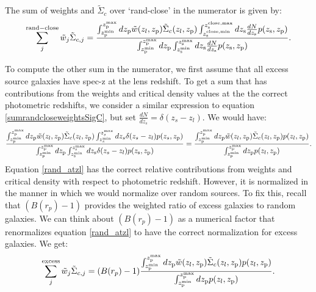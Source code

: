 \documentclass[onecolumn,amsmath,aps,fleqn, superscriptaddress]{revtex4}
\begin{document}
The sum of weights and $\tilde{\Sigma}_{c}$ over `rand-close' in the numerator is given by:
\begin{equation}
\sum\limits_{j}^{\rm rand-close} \tilde{w}_j \tilde{\Sigma}_{c,j} = \frac{\int_{z_{\rm p}^{\rm min}}^{z_{\rm p}^{\rm max}} d z_{\rm p} \tilde{w}(z_l, z_{\rm p})\tilde{\Sigma}_c(z_l, z_{\rm p}) \int_{z_{\rm s}^{\rm close, min}}^{z_{\rm s}^{\rm close, max}} dz_{\rm s} \frac{dN}{dz_{\rm s}} p(z_{\rm s}, z_{\rm p})}{\int_{z_{\rm p}^{\rm min}}^{z_{\rm p}^{\rm max}} d z_{\rm p} \int_{z_{\rm s}^{\rm min}}^{z_{\rm s}^{\rm max}} dz_{\rm s} \frac{dN}{dz_{\rm s}} p(z_{\rm s}, z_{\rm p})}.
\label{sumrandcloseweightsSigC}
\end{equation}

To compute the other sum in the numerator, we first assume that all excess source galaxies have spec-z at the lens redshift. To get a sum that has contributions from the weights and critical density values at the the correct photometric redshifts, we consider a similar expression to equation \ref{sumrandcloseweightsSigC}, but set $\frac{dN}{dz_s} = \delta(z_s-z_l)$. We would have:
\begin{align}
\frac{\int_{z_{\rm p}^{\rm min}}^{z_{\rm p}^{\rm max}} dz_{\rm p}\tilde{w}(z_l, z_{\rm p}) \tilde{\Sigma}_c(z_l, z_{\rm p}) \int_{z_s^{\rm min}}^{z_s^{\rm max}} dz_s \delta(z_s - z_l) p(z_s, z_{\rm p})}{\int_{z_{\rm p}^{\rm min}}^{z_{\rm p}^{\rm max}} d z_{\rm p} \int_{z_{\rm s}^{\rm min}}^{z_{\rm s}^{\rm max}} dz_{\rm s} \delta(z_s - z_l) p(z_{\rm s}, z_{\rm p})} = \frac{\int_{z_{\rm p}^{\rm min}}^{z_{\rm p}^{\rm max}} dz_{\rm p}\tilde{w}(z_l, z_{\rm p}) \tilde{\Sigma}_c(z_l, z_{\rm p}) p(z_l, z_{\rm p})}{\int_{z_{\rm p}^{\rm min}}^{z_{\rm p}^{\rm max}} d z_{\rm p} p(z_l, z_{\rm p})}.
\label{rand_atzl}
\end{align}
Equation \ref{rand_atzl} has the correct relative contributions from weights and critical density with respect to photometric redshift. However, it is normalized in the manner in which we would normalize over random sources. To fix this, recall that $(B(r_p) -1)$ provides the weighted ratio of excess galaxies to random galaxies. We can think about $(B(r_p) -1)$ as a numerical factor that renormalizes equation \ref{rand_atzl} to have the correct normalization for excess galaxies. We get:
\begin{equation}
\sum\limits_{j}^{\rm excess} \tilde{w}_j \tilde{\Sigma}_{c,j} = (B(r_p) - 1) \frac{\int_{z_{\rm p}^{\rm min}}^{z_{\rm p}^{\rm max}} dz_{\rm p} \tilde{w}(z_l, z_{\rm p}) \tilde{\Sigma}_c(z_l, z_{\rm p}) p(z_l, z_{\rm p})}{\int_{z_{\rm p}^{\rm min}}^{z_{\rm p}^{\rm max}} d z_{\rm p} p(z_l, z_{\rm p})}.
\label{sumexcesswSigC}
\end{equation}
\end{document}
